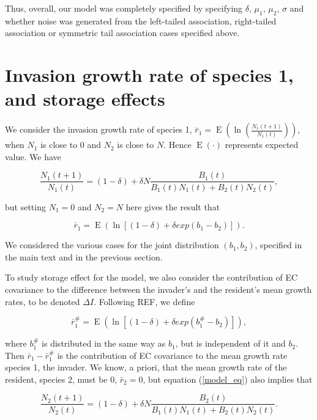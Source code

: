 \documentclass[letterpaper,11pt]{article}
\DeclareMathOperator{\EX}{E}%
\begin{document}
Thus, overall, our model was completely specified by specifying $\delta$, $\mu_1$, $\mu_2$, $\sigma$ and whether noise was generated from the left-tailed association, right-tailed association or symmetric tail association cases specified above. 



\section{Invasion growth rate of species 1, and storage effects} \label{sect:IGR}

We consider the invasion growth rate of species 1, $\bar r_1=\EX(\ln (\frac{N_1(t+1)}{N_1(t)}))$, when $N_1$ is close to 0 and $N_2$ is close to $N$. Hence $\EX(\cdot)$ represents expected value. We have 

\begin{equation}
\frac{N_1(t+1)}{N_1(t)}=(1-\delta)+\delta N \frac{B_1(t)}{B_1(t)N_1(t)+B_2(t)N_2(t)},  \label{sp1_Nt+1_over_Nt}
\end{equation}

\noindent but setting $N_1=0$ and $N_2=N$ here gives the result that

\begin{equation}
\bar r_1=\EX(\ln [(1-\delta)+\delta exp(b_1-b_2)]).  \label{rbar1_E}
\end{equation}

\noindent We considered the various cases for the joint distribution $(b_1,b_2)$, specified in the main text and in the previous section. 

To study storage effect for the model, we also consider the contribution of EC covariance to the difference between the invader's and the resident's mean growth rates, to be denoted $\Delta I$. Following REF, we define 

\begin{equation}
\bar r_1^\#=\EX(\ln [(1-\delta)+\delta exp(b_1^\#-b_2)]),  \label{rbar1sharp_E}
\end{equation}

\noindent where $b_1^\#$ is distributed in the same way as $b_1$, but is independent of it and $b_2$. Then $\bar r_1 - \bar r_1^\#$ is the contribution of EC covariance to the mean growth rate species 1, the invader. We know, a priori, that the mean growth rate of the resident, species 2, must be 0, $\bar r_2 =0$, but equation (\ref{model_eq}) also implies that

\begin{equation}
\frac{N_2(t+1)}{N_2(t)}=(1-\delta)+\delta N \frac{B_2(t)}{B_1(t)N_1(t)+B_2(t)N_2(t)}.  \label{sp2_Nt+1_over_Nt}
\end{equation}
\end{document}
